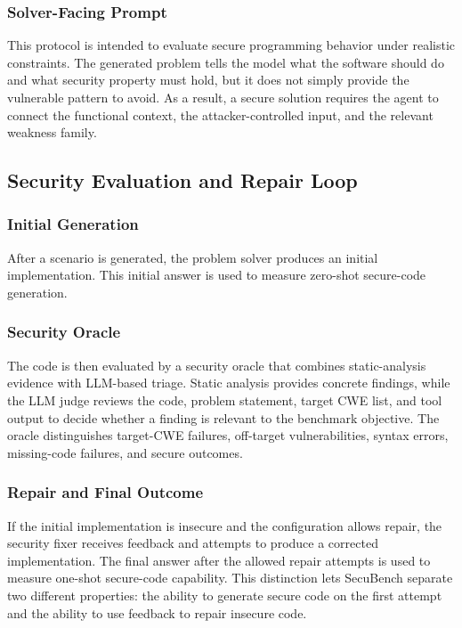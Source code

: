 \documentclass[11pt]{article}
\newcommand{\toolname}{SecuBench}
\begin{document}
\subsubsection{Solver-Facing Prompt}

This protocol is intended to evaluate secure programming behavior under realistic constraints. The generated problem tells the model what the software should do and what security property must hold, but it does not simply provide the vulnerable pattern to avoid. As a result, a secure solution requires the agent to connect the functional context, the attacker-controlled input, and the relevant weakness family.

\subsection{Security Evaluation and Repair Loop}

\subsubsection{Initial Generation}

After a scenario is generated, the problem solver produces an initial implementation. This initial answer is used to measure zero-shot secure-code generation.

\subsubsection{Security Oracle}

The code is then evaluated by a security oracle that combines static-analysis evidence with LLM-based triage. Static analysis provides concrete findings, while the LLM judge reviews the code, problem statement, target CWE list, and tool output to decide whether a finding is relevant to the benchmark objective. The oracle distinguishes target-CWE failures, off-target vulnerabilities, syntax errors, missing-code failures, and secure outcomes.

\subsubsection{Repair and Final Outcome}

If the initial implementation is insecure and the configuration allows repair, the security fixer receives feedback and attempts to produce a corrected implementation. The final answer after the allowed repair attempts is used to measure one-shot secure-code capability. This distinction lets \toolname{} separate two different properties: the ability to generate secure code on the first attempt and the ability to use feedback to repair insecure code.
\end{document}
